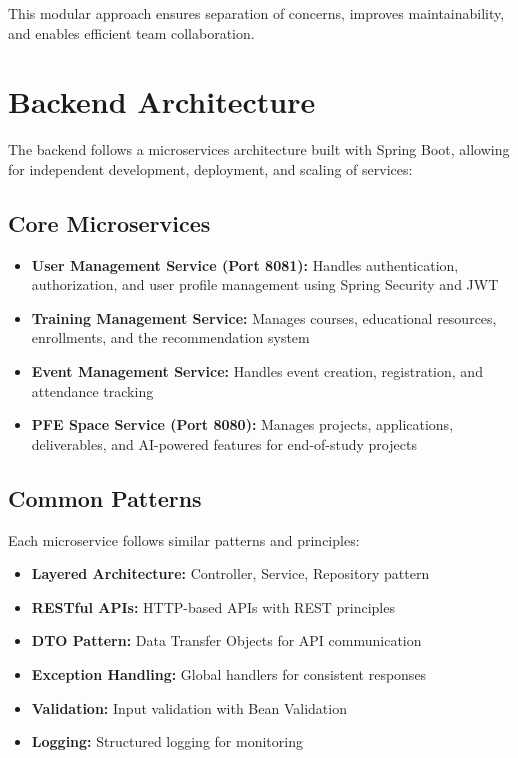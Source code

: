 \documentclass[12pt,a4paper]{report}
\begin{document}
This modular approach ensures separation of concerns, improves maintainability, and enables efficient team collaboration.

\section{Backend Architecture}

The backend follows a microservices architecture built with Spring Boot, allowing for independent development, deployment, and scaling of services:

\subsection{Core Microservices}

\begin{itemize}
    \item \textbf{User Management Service (Port 8081):} Handles authentication, authorization, and user profile management using Spring Security and JWT

    \item \textbf{Training Management Service:} Manages courses, educational resources, enrollments, and the recommendation system

    \item \textbf{Event Management Service:} Handles event creation, registration, and attendance tracking

    \item \textbf{PFE Space Service (Port 8080):} Manages projects, applications, deliverables, and AI-powered features for end-of-study projects
\end{itemize}

\subsection{Common Patterns}

Each microservice follows similar patterns and principles:

\begin{itemize}
    \item \textbf{Layered Architecture:} Controller, Service, Repository pattern
    \item \textbf{RESTful APIs:} HTTP-based APIs with REST principles
    \item \textbf{DTO Pattern:} Data Transfer Objects for API communication
    \item \textbf{Exception Handling:} Global handlers for consistent responses
    \item \textbf{Validation:} Input validation with Bean Validation
    \item \textbf{Logging:} Structured logging for monitoring
\end{itemize}
\end{document}
